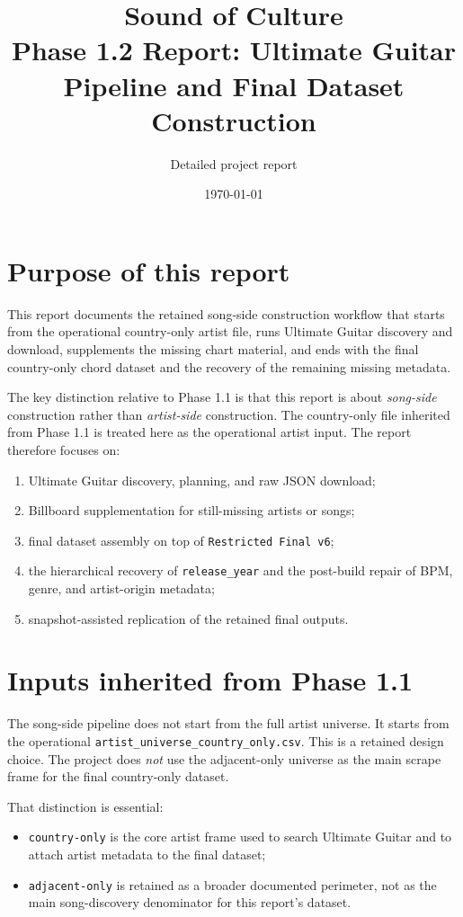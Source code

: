 \documentclass[11pt]{article}
\title{Sound of Culture\\Phase 1.2 Report: Ultimate Guitar Pipeline and Final Dataset Construction}
\author{Detailed project report}
\date{\today}
\begin{document}
\maketitle
\tableofcontents
\clearpage

\section{Purpose of this report}
This report documents the retained song-side construction workflow that starts
from the operational country-only artist file, runs Ultimate Guitar discovery
and download, supplements the missing chart material, and ends with the final
country-only chord dataset and the recovery of the remaining missing metadata.

The key distinction relative to Phase 1.1 is that this report is about
\emph{song-side} construction rather than \emph{artist-side} construction. The
country-only file inherited from Phase 1.1 is treated here as the operational
artist input. The report therefore focuses on:
\begin{enumerate}[leftmargin=2em]
\item Ultimate Guitar discovery, planning, and raw JSON download;
\item Billboard supplementation for still-missing artists or songs;
\item final dataset assembly on top of \texttt{Restricted Final v6};
\item the hierarchical recovery of \texttt{release\_year} and the post-build
repair of BPM, genre, and artist-origin metadata;
\item snapshot-assisted replication of the retained final outputs.
\end{enumerate}

\section{Inputs inherited from Phase 1.1}
The song-side pipeline does not start from the full artist universe. It starts
from the operational \texttt{artist\_universe\_country\_only.csv}. This is a
retained design choice. The project does \emph{not} use the adjacent-only
universe as the main scrape frame for the final country-only dataset.

That distinction is essential:
\begin{itemize}[leftmargin=2em]
\item \texttt{country-only} is the core artist frame used to search Ultimate
Guitar and to attach artist metadata to the final dataset;
\item \texttt{adjacent-only} is retained as a broader documented perimeter, not
as the main song-discovery denominator for this report's dataset.
\end{itemize}
\end{document}

